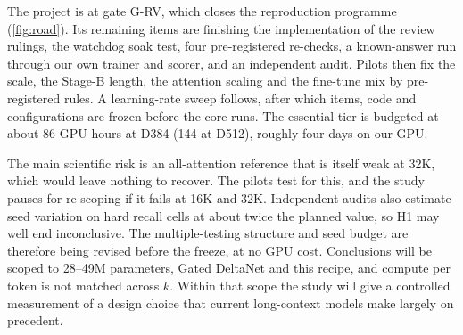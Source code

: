 \documentclass[10pt,a4paper]{article}
\begin{document}
The project is at gate G-RV, which closes the reproduction programme (\cref{fig:road}). Its remaining items are
finishing the implementation of the review rulings, the watchdog soak test, four pre-registered re-checks, a
known-answer run through our own trainer and scorer, and an independent audit. Pilots then fix the scale, the
Stage-B length, the attention scaling and the fine-tune mix by pre-registered rules. A learning-rate sweep follows, after which items, code and configurations are frozen
before the core runs. The essential tier is budgeted at about 86 GPU-hours at D384 (144 at D512), roughly
four days on our GPU.

The main scientific risk is an all-attention reference that is itself weak at 32K, which would leave
nothing to recover. The pilots test for this, and the study pauses for re-scoping if it fails at 16K and 32K.
Independent audits also estimate seed variation on hard recall cells at about twice the planned value,
so H1 may well end inconclusive. The multiple-testing structure and seed budget are therefore being
revised before the freeze, at no GPU cost. Conclusions will be scoped to 28--49M parameters, Gated DeltaNet and this
recipe, and compute per token is not matched across $k$. Within that scope the study will give a controlled
measurement of a design choice that current long-context models make largely on precedent.


{\small}
\end{document}
